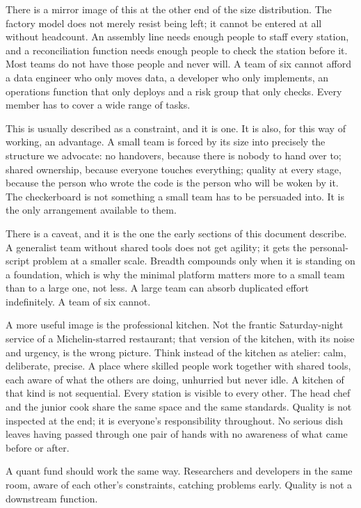 \documentclass[
  11pt,
]{article}
\begin{document}
There is a mirror image of this at the other end of the size
distribution. The factory model does not merely resist being left; it
cannot be entered at all without headcount. An assembly line needs
enough people to staff every station, and a reconciliation function
needs enough people to check the station before it. Most teams do not
have those people and never will. A team of six cannot afford a data
engineer who only moves data, a developer who only implements, an
operations function that only deploys and a risk group that only checks.
Every member has to cover a wide range of tasks.

This is usually described as a constraint, and it is one. It is also,
for this way of working, an advantage. A small team is forced by its size
into precisely the structure we advocate: no handovers, because there is
nobody to hand over to; shared ownership, because everyone touches
everything; quality at every stage, because the person who wrote the code
is the person who will be woken by it. The checkerboard is not something
a small team has to be persuaded into. It is the only arrangement
available to them.

There is a caveat, and it is the one the early sections of this document
describe. A generalist team without shared tools does not get agility; it
gets the personal-script problem at a smaller scale. Breadth compounds
only when it is standing on a foundation, which is why the minimal
platform matters more to a small team than to a large one, not less. A
large team can absorb duplicated effort indefinitely. A team of six
cannot.

A more useful image is the professional kitchen. Not the frantic
Saturday-night service of a Michelin-starred restaurant; that version
of the kitchen, with its noise and urgency, is the wrong picture. Think
instead of the kitchen as atelier: calm, deliberate, precise. A place
where skilled people work together with shared tools, each aware of what
the others are doing, unhurried but never idle. A kitchen of that kind
is not sequential. Every station is visible to every other. The head
chef and the junior cook share the same space and the same standards.
Quality is not inspected at the end; it is everyone's responsibility
throughout. No serious dish leaves having passed through one pair of
hands with no awareness of what came before or after.

A quant fund should work the same way. Researchers and developers in the
same room, aware of each other's constraints, catching problems early.
Quality is not a downstream function.
\end{document}
